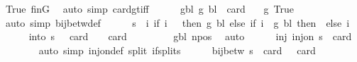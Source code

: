 \begin{isabellebody}
\ True\ finG\ \isamarkupfalse%
\ {\isacharparenleft}{\kern0pt}auto\ simp{\isacharcolon}{\kern0pt}\ card{\isacharunderscore}{\kern0pt}gt{\isacharunderscore}{\kern0pt}{}{\isacharunderscore}{\kern0pt}iff{\isacharparenright}{\kern0pt}\isanewline
\ \ \ \ \isamarkupfalse%
\ gbl{\isacharcolon}{\kern0pt}\ {\isachardoublequoteopen}g\ bl\ {\isacharless}{\kern0pt}\ card\ {\isasymGamma}{\isachardoublequoteclose}\ \isamarkupfalse%
\ g\ True\ \isamarkupfalse%
\ {\isacharparenleft}{\kern0pt}auto\ simp{\isacharcolon}{\kern0pt}\ bij{\isacharunderscore}{\kern0pt}betw{\isacharunderscore}{\kern0pt}def{\isacharparenright}{\kern0pt}\isanewline
\ \ \ \ \isamarkupfalse%
\ {\isacharquery}{\kern0pt}s\ {\isacharequal}{\kern0pt}\ {\isachardoublequoteopen}{\isasymlambda}i{\isachardot}{\kern0pt}\ if\ i\ {\isacharequal}{\kern0pt}\ {}\ then\ g\ bl\ else\ if\ i\ {\isacharequal}{\kern0pt}\ g\ bl\ then\ {}\ else\ i{\isachardoublequoteclose}\isanewline
\ \ \ \ \isamarkupfalse%
\ into{\isacharcolon}{\kern0pt}\ {\isachardoublequoteopen}{\isacharquery}{\kern0pt}s\ {\isacharbackquote}{\kern0pt}\ {\isacharbraceleft}{\kern0pt}{\isachardot}{\kern0pt}{\isachardot}{\kern0pt}{\isacharless}{\kern0pt}\ card\ {\isasymGamma}{\isacharbraceright}{\kern0pt}\ {\isasymsubseteq}\ {\isacharbraceleft}{\kern0pt}{\isachardot}{\kern0pt}{\isachardot}{\kern0pt}{\isacharless}{\kern0pt}\ card\ {\isasymGamma}{\isacharbraceright}{\kern0pt}{\isachardoublequoteclose}\isanewline
\ \ \ \ \ \ \isamarkupfalse%
\ gbl\ npos\ \isamarkupfalse%
\ auto\isanewline
\ \ \ \ \isamarkupfalse%
\ inj{\isacharcolon}{\kern0pt}\ {\isachardoublequoteopen}inj{\isacharunderscore}{\kern0pt}on\ {\isacharquery}{\kern0pt}s\ {\isacharbraceleft}{\kern0pt}{\isachardot}{\kern0pt}{\isachardot}{\kern0pt}{\isacharless}{\kern0pt}\ card\ {\isasymGamma}{\isacharbraceright}{\kern0pt}{\isachardoublequoteclose}\isanewline
\ \ \ \ \ \ \isamarkupfalse%
\ {\isacharparenleft}{\kern0pt}auto\ simp{\isacharcolon}{\kern0pt}\ inj{\isacharunderscore}{\kern0pt}on{\isacharunderscore}{\kern0pt}def\ split{\isacharcolon}{\kern0pt}\ if{\isacharunderscore}{\kern0pt}splits{\isacharparenright}{\kern0pt}\isanewline
\ \ \ \ \isamarkupfalse%
\ {\isachardoublequoteopen}bij{\isacharunderscore}{\kern0pt}betw\ {\isacharquery}{\kern0pt}s\ {\isacharbraceleft}{\kern0pt}{\isachardot}{\kern0pt}{\isachardot}{\kern0pt}{\isacharless}{\kern0pt}\ card\ {\isasymGamma}{\isacharbraceright}{\kern0pt}\ {\isacharbraceleft}{\kern0pt}{\isachardot}{\kern0pt}{\isachardot}{\kern0pt}{\isacharless}{\kern0pt}\ card\ {\isasymGamma}{\isacharbraceright}{\kern0pt}{\isachardoublequoteclose}\isanewline

\end{isabellebody}
